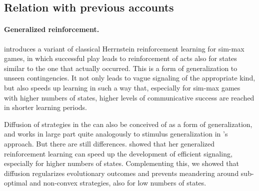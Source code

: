 \documentclass[fleqn,reqno,10pt]{article}
\newcommand{\rdd}{\acro{rdd}} %
\begin{document}
\subsection{Relation with previous accounts}
\label{sec:relat-with-prev}

\paragraph{Generalized reinforcement.}


\citet{OConnor2013:The-Evolution-o} introduces a variant of classical Herrnstein reinforcement
learning for sim-max games, in which successful play leads to reinforcement of acts also for
states similar to the one that actually occurred. This is a form of generalization to unseen
contingencies. It not only leads to vague signaling of the appropriate kind, but also speeds up
learning in such a way that, especially for sim-max games with higher numbers of states, higher
levels of communicative success are reached in shorter learning
periods. %

Diffusion of strategies in the \rdd can also be conceived of as a form of generalization, and
works in large part quite analogously to stimulus generalization in
\citeauthor{OConnor2013:The-Evolution-o}'s approach. But there are still
differences. \citeauthor{OConnor2013:The-Evolution-o} showed that her generalized reinforcement
learning can speed up the development of efficient signaling, especially for higher numbers of
states. Complementing this, we showed that diffusion regularizes evolutionary outcomes and
prevents meandering around sub-optimal and non-convex strategies, also for low numbers of
states.
\end{document}
